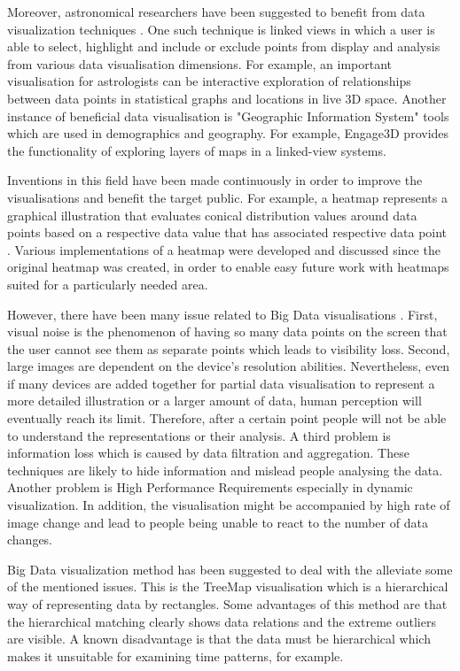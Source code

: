\documentclass{l4proj}
\begin{document}
Moreover, astronomical researchers have been suggested to benefit from data visualization techniques \cite{goodman2012principles}. One such technique is linked views in which a user is able to select, highlight and include or exclude points from display and analysis from various data visualisation dimensions. For example, an important visualisation for astrologists can be interactive exploration of relationships between data points in statistical graphs and locations in live 3D space. Another instance of beneficial data visualisation is "Geographic Information System" tools which are used in demographics and geography. For example, Engage3D provides the functionality of exploring layers of maps in a linked-view systems. 

Inventions in this field have been made continuously in order to improve the visualisations and benefit the target public. For example, a heatmap represents a graphical illustration that evaluates conical distribution values around data points based on a respective data value that has associated respective data point \cite{cardno2014data}. Various implementations of a heatmap were developed and discussed since the original heatmap was created, in order to enable easy future work with heatmaps suited for a particularly needed area.

However, there have been many issue related to Big Data visualisations \cite{gorodov2013analytical}. First, visual noise is the phenomenon of having so many data points on the screen that the user cannot see them as separate points which leads to visibility loss. Second, large images are dependent on the device's resolution abilities. Nevertheless, even if many devices are added together for partial data visualisation to represent a more detailed illustration or a larger amount of data, human perception will eventually reach its limit. Therefore, after a certain point people will not be able to understand the representations or their analysis. A third problem is information loss which is caused by data filtration and aggregation. These techniques are likely to hide information and mislead people analysing the data. Another problem is High Performance Requirements especially in dynamic visualization. In addition, the visualisation might be accompanied by high rate of image change and lead to people being unable to react to the number of data changes. 

Big Data visualization method has been suggested  to deal with the alleviate some of the mentioned issues. This is the TreeMap visualisation \cite{gorodov2013analytical} which is a hierarchical way of representing data by rectangles. Some advantages of this method are that the hierarchical matching clearly shows data relations and the extreme outliers are visible. A known  disadvantage is that the data must be hierarchical which makes it unsuitable for examining time patterns, for example. 
\end{document}
